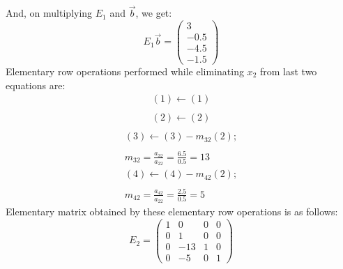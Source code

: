 \documentclass[12pt, oneside,table]{report}
\newcommand{\?}{\stackrel{?}{=}}
\theoremstyle{definition}
\begin{document}
And, on multiplying $E_{1}$ and $\overrightarrow{b}$, we get:
\begin{equation}
    E_{1}\overrightarrow{b}=
    \begin{pmatrix}
    3\\
    -0.5\\
    -4.5\\
    -1.5
    \end{pmatrix}
\end{equation}
Elementary row operations performed while eliminating $x_{2}$ from last two equations are:
\begin{equation}
\begin{matrix}
    \left(1\right) \longleftarrow \left(1\right) \\
    
    \end{matrix}
\end{equation}
\begin{equation}
\begin{matrix}
    \left(2\right) \longleftarrow \left(2\right) \\
    
    \end{matrix}
\end{equation}
\begin{equation}
\begin{matrix}
    \left(3\right) \longleftarrow \left(3\right) - m_{32}\left(2\right);\\
    \\
    m_{32} = \frac{a_{32}}{a_{22}}=\frac{6.5}{0.5}=13
    \end{matrix}
\end{equation}
\begin{equation}
\begin{matrix}
    \left(4\right) \longleftarrow \left(4\right) - m_{42}\left(2\right);\\
    \\
    m_{42} = \frac{a_{42}}{a_{22}}=\frac{2.5}{0.5}=5
    
    \end{matrix}
\end{equation}
Elementary matrix obtained by these elementary row operations is as follows:
\begin{equation}
    E_{2}=\begin{pmatrix}
    1&0&0&0\\
    0&1&0&0\\
    0&-13&1&0\\
    0&-5&0&1
    \end{pmatrix}
\end{equation}
\end{document}
